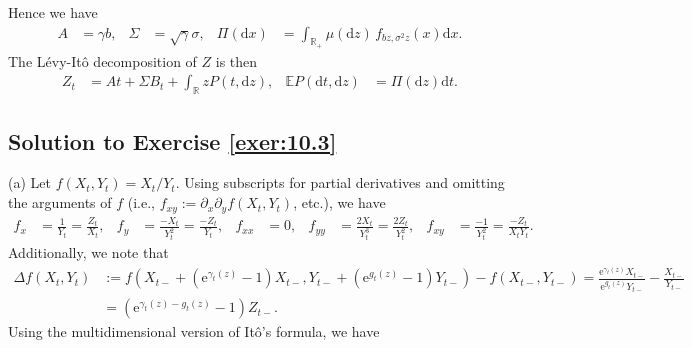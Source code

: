 \documentclass[12pt]{book}
\numberwithin{equation}{chapter}
\theoremstyle{plain}
\numberwithin{theorem}{section}
\theoremstyle{definition}
\numberwithin{exercise}{chapter}
\newcommand{\<}{\langle}
\renewcommand{\>}{\rangle}
\renewcommand{\(}{\left(}
\renewcommand{\)}{\right)}
\renewcommand{\[}{\left[}
\renewcommand{\]}{\right]}
\newcommand\Eb{\mathds{E}}
\newcommand\Rb{\mathds{R}}
\newcommand\sig{\sigma}
\newcommand\Sig{\Sigma}
\newcommand\gam{\gamma}
\newcommand\Del{\Delta}
\renewcommand\d{\partial}
\newcommand\dd{\mathrm{d}}
\newcommand\ee{\mathrm{e}}
\begin{document}
Hence we have
\begin{align}
A
	&=	\gam b , &
\Sig
	&=	\sqrt{\gam} \sig , &
\Pi(\dd x)
	&=	\int_{\Rb_+} \mu(\dd z) \, f_{b z, \sig^2 z}(x) \dd x .
\end{align}
The L\'evy-It\^o decomposition of $Z$ is then
\begin{align}
Z_t
	&=	A t + \Sig B_t + \int_{\Rb} z P(t,\dd z) , &
\Eb P(\dd t, \dd z)
	&=	\Pi(\dd z ) \dd t .
\end{align}

\subsection*{Solution to Exercise \ref{exer:10.3}}
(a) Let $f(X_t,Y_t) = X_t/Y_t$.  Using subscripts for partial derivatives and omitting the arguments of $f$ (i.e., $f_{xy}:= \d_x\d_y f(X_t,Y_t)$, etc.), we have
\begin{align}
f_x
	&=	\frac{1}{Y_t} = \frac{Z_t}{X_t}, &
f_y
	&=	\frac{-X_t}{Y_t^2} = \frac{-Z_t}{Y_t} , &
f_{xx}
	&=	0 , &
f_{yy}
	&=	\frac{2 X_t}{Y_t^3} = \frac{2 Z_t}{Y_t^2}, &
f_{xy}
	&=	\frac{-1}{Y_t^2} = \frac{-Z_t}{X_t Y_t}. 
\end{align}
Additionally, we note that
\begin{align}
\Del f(X_t,Y_t)
	&:=	f(X_{t-} + ( \ee^{\gam_t(z)}-1) X_{t-}, Y_{t-} + ( \ee^{g_t(z)}-1) Y_{t-} ) - f(X_{t-} , Y_{t-} )
	=		\frac{\ee^{\gam_t(z)}X_{t-}}{\ee^{g_t(z)}Y_{t-}} - \frac{X_{t-}}{Y_{t-}} \\
	&=		(\ee^{\gam_t(z)-g_t(z)} - 1 )Z_{t-} . 
\end{align}
Using the multidimensional version of It\^o's formula, we have
\end{document}
